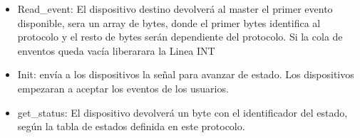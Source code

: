 \begin{itemize}
      \item{} Read\_event: El dispositivo destino devolverá al master el primer evento disponible, sera un array de
            bytes, donde el primer bytes identifica al protocolo y el resto de bytes serán dependiente del protocolo.
            Si la cola de enventos queda vacía liberarara la Linea INT
      \item{} Init: envía a los dispositivos la señal para avanzar de estado. Los dispositivos empezaran a aceptar
            los eventos de los usuarios.
      \item{} get\_status: El dispositivo devolverá un byte con el identificador del estado, según la tabla de
            estados definida en este protocolo.

\end{itemize}